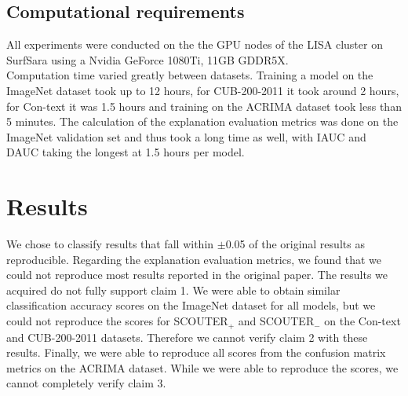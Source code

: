 \subsection{Computational requirements}
All experiments were conducted on the the GPU nodes of the LISA cluster on SurfSara using a Nvidia GeForce 1080Ti, 11GB GDDR5X.
\\
Computation time varied greatly between datasets. Training a model on the ImageNet dataset took up to 12 hours, for CUB-200-2011 it took around 2 hours, for Con-text it was 1.5 hours and training on the ACRIMA dataset took less than 5 minutes. The calculation of the explanation evaluation metrics was done on the ImageNet validation set and thus took a long time as well, with IAUC and DAUC taking the longest at 1.5 hours per model.

\section{Results}
\label{sec:results}
We chose to classify results that fall within $\pm$0.05 of the original results as reproducible. Regarding the explanation evaluation metrics, we found that we could not reproduce most results reported in the original paper. The results we acquired do not fully support claim 1. We were able to obtain similar classification accuracy scores on the ImageNet dataset for all models, but we could not reproduce the scores for SCOUTER$_+$ and SCOUTER$_-$ on the Con-text and CUB-200-2011 datasets. Therefore we cannot verify claim 2 with these results. Finally, we were able to reproduce all scores from the confusion matrix metrics on the ACRIMA dataset. While we were able to reproduce the scores, we cannot completely verify claim 3.

